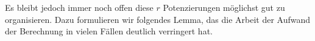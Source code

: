 Es bleibt jedoch immer noch offen diese $r$ Potenzierungen möglichst gut
zu organisieren. 
Dazu formulieren wir folgendes Lemma, das die Arbeit der Aufwand der Berechnung
in vielen Fällen deutlich verringert hat.

